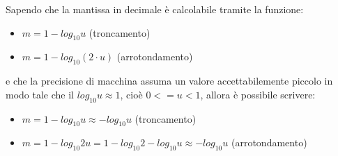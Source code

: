 Sapendo che la mantissa in decimale è calcolabile tramite la funzione:
\begin{itemize}
\item \( m = 1- log_{10}{u} \) (troncamento) 
\item \( m = 1- log_{10}{(2\cdot u)} \) (arrotondamento)
\end{itemize}
e che la precisione di macchina assuma un valore accettabilemente piccolo in modo tale che il \(log_{10}{u} \approx 1\), cioè $0<=u<1$, allora è possibile scrivere:
\begin{itemize}
\item \( m = 1 - log_{10}{u} \approx -log_{10}{u} \) (troncamento)
\item \( m = 1 - log_{10}{2u} = 1 - log_{10}{2} - log_{10}{u} \approx -log_{10}{u} \) (arrotondamento)
\end{itemize}